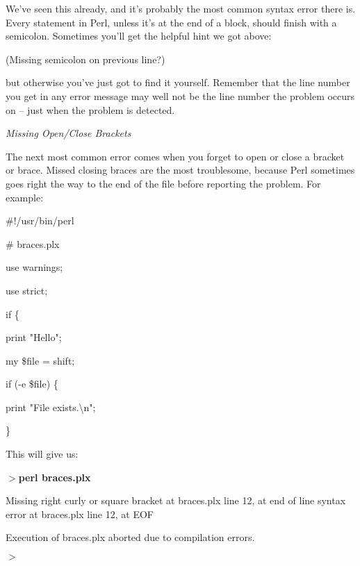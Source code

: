 \documentclass[a4paper,11pt]{book}
\begin{document}
\noindent We've seen this already, and it's probably the most common syntax error there is. Every statement in Perl, unless it's at the end of a block, should finish with a semicolon. Sometimes you'll get the helpful hint we got above:

\noindent 

\noindent (Missing semicolon on previous line?)

\noindent 

\noindent but otherwise you've just got to find it yourself. Remember that the line number you get in any error message may well not be the line number the problem occurs on -- just when the problem is detected.

\noindent 

\noindent \textit{Missing Open/Close Brackets}

\noindent The next most common error comes when you forget to open or close a bracket or brace. Missed closing braces are the most troublesome, because Perl sometimes goes right the way to the end of the file before reporting the problem. For example:

\noindent 

\noindent \#!/usr/bin/perl

\noindent \# braces.plx

\noindent use warnings;

\noindent use strict;

\noindent 

\noindent 

\noindent if \{

\noindent print "Hello";

\noindent 

\noindent my \$file = shift;

\noindent if (-e \$file) \{

\noindent print "File exists.\textbackslash n";

\noindent \}

\noindent 

\noindent This will give us:

\noindent 

\noindent $>$\textbf{perl braces.plx}

\noindent Missing right curly or square bracket at braces.plx line 12, at end of line syntax error at braces.plx line 12, at EOF

\noindent Execution of braces.plx aborted due to compilation errors.

\noindent $>$
\end{document}
